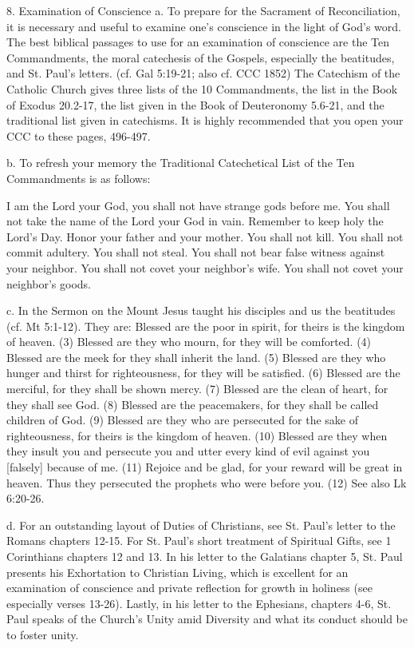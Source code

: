 \documentclass[oneside]{book}
\begin{document}
8. Examination of Conscience
a. To prepare for the Sacrament of Reconciliation, it is necessary and useful to
examine one's conscience in the light of God's word. The best biblical passages
to use for an examination of conscience are the Ten Commandments, the moral
catechesis of the Gospels, especially the beatitudes, and St. Paul's
letters. (cf. Gal 5:19-21; also cf. CCC 1852) The Catechism of the Catholic
Church gives three lists of the 10 Commandments, the list in the Book of Exodus
20.2-17, the list given in the Book of Deuteronomy 5.6-21, and the traditional
list given in catechisms. It is highly recommended that you open your CCC to
these pages, 496-497.

b. To refresh your memory the Traditional Catechetical List of the Ten
Commandments is as follows:

I am the Lord your God, you shall not have strange gods before me.
You shall not take the name of the Lord your God in vain.
Remember to keep holy the Lord's Day.
Honor your father and your mother.
You shall not kill.
You shall not commit adultery.
You shall not steal.
You shall not bear false witness against your neighbor.
You shall not covet your neighbor's wife.
You shall not covet your neighbor's goods.

c. In the Sermon on the Mount Jesus taught his disciples and us the beatitudes
(cf. Mt 5:1-12). They are: Blessed are the poor in spirit, for theirs is the
kingdom of heaven. (3) Blessed are they who mourn, for they will be
comforted. (4) Blessed are the meek for they shall inherit the land. (5) Blessed
are they who hunger and thirst for righteousness, for they will be
satisfied. (6) Blessed are the merciful, for they shall be shown mercy. (7)
Blessed are the clean of heart, for they shall see God. (8) Blessed are the
peacemakers, for they shall be called children of God. (9) Blessed are they who
are persecuted for the sake of righteousness, for theirs is the kingdom of
heaven. (10) Blessed are they when they insult you and persecute you and utter
every kind of evil against you [falsely] because of me. (11) Rejoice and be
glad, for your reward will be great in heaven. Thus they persecuted the prophets
who were before you. (12) See also Lk 6:20-26.

d. For an outstanding layout of Duties of Christians, see St. Paul's letter to
the Romans chapters 12-15. For St. Paul's short treatment of Spiritual Gifts,
see 1 Corinthians chapters 12 and 13. In his letter to the Galatians chapter 5,
St. Paul presents his Exhortation to Christian Living, which is excellent for an
examination of conscience and private reflection for growth in holiness (see
especially verses 13-26). Lastly, in his letter to the Ephesians, chapters 4-6,
St. Paul speaks of the Church's Unity amid Diversity and what its conduct should
be to foster unity.
\end{document}
